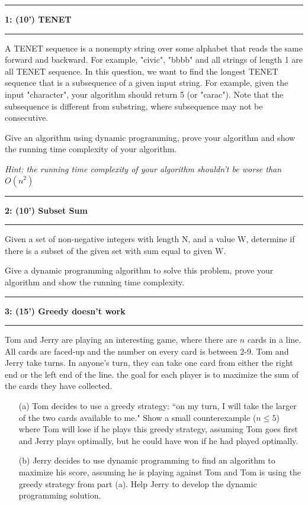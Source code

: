 \documentclass[10.5pt]{article}
\newcommand\question[2]{\vspace{.25in}\hrule\textbf{#1: #2}\vspace{.5em}\hrule\vspace{.10in}}
\begin{document}
\newpage
\question{1}{(10') TENET}
A TENET sequence is a nonempty string over some alphabet that reads the same forward and backward. For example, "civic", "bbbb" and all strings of length 1 are all TENET sequence. In this question, we want to find the longest TENET sequence that is a subsequence of a given input string. For example, given the input "character", your algorithm should return 5 (or "carac"). Note that the subsequence is different from substring, where subsequence may not be 
consecutive. 

Give an algorithm using dynamic programming, prove your algorithm and  show the running time complexity of your algorithm. 

\textit{Hint: the running time complexity of your algorithm shouldn't be worse than $O(n^{2})$}
	
\pagebreak
	
\question{2}{(10') Subset Sum}
Given a set of non-negative integers with length N, and a value W, determine if there is a subset of the given set with sum equal to given W. 

Give a dynamic programming algorithm to solve this problem, prove your algorithm and show the running time complexity.

\pagebreak
\question{3}{(15') Greedy doesn't work}

Tom and Jerry are playing an interesting game, where there are $n$ cards in a line. All cards are faced-up and the number on every card is between 2-9. Tom and Jerry take turns. In anyone's turn, they can take one card from either the right end or the left end of the line. the goal for each player is to maximize the sum of the cards they have collected.

\begin{enumerate}
\item[(a)] Tom decides to use a greedy strategy: ``on my turn, I will take the larger of the two cards available to me." Show a small counterexample ($n\leq 5$) where Tom will lose if he plays this greedy strategy, assuming Tom goes first and Jerry plays optimally, but he could have won if he had played optimally.
\item[(b)] Jerry decides to use dynamic programming to find an algorithm to maximize his score, assuming he is playing against Tom and Tom is using the greedy strategy from part (a). Help Jerry to develop the dynamic programming solution.
\end{enumerate}
\pagebreak
\end{document}
